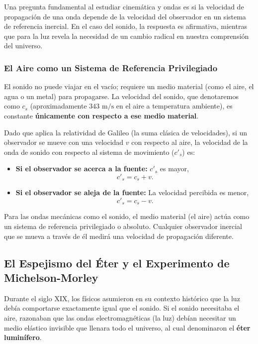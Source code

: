 \documentclass[11pt,a4paper]{book}
\begin{document}
Una pregunta fundamental al estudiar cinemática y ondas es si la velocidad de propagación de una onda depende de la velocidad del observador en un sistema de referencia inercial. En el caso del sonido, la respuesta es afirmativa, mientras que para la luz revela la necesidad de un cambio radical en nuestra comprensión del universo.

\subsubsection{El Aire como un Sistema de Referencia Privilegiado}

El sonido no puede viajar en el vacío; requiere un medio material (como el aire, el agua o un metal) para propagarse. La velocidad del sonido, que denotaremos como $c_s$ (aproximadamente $343 \text{ m/s}$ en el aire a temperatura ambiente), es constante \textbf{únicamente con respecto a ese medio material}.

Dado que aplica la relatividad de Galileo (la suma clásica de velocidades), si un observador se mueve con una velocidad $v$ con respecto al aire, la velocidad de la onda de sonido con respecto al sistema de movimiento ($c'_s$) es:
\begin{itemize}
    \item \textbf{Si el observador se acerca a la fuente:} $c'_s$ es mayor,
    \begin{equation}
       c'_s = c_s + v.
    \end{equation}
    \item \textbf{Si el observador se aleja de la fuente:} La velocidad percibida es menor,
    \begin{equation}
        c'_s = c_s - v.
    \end{equation}
\end{itemize}

Para las ondas mecánicas como el sonido, el medio material (el aire) actúa como un sistema de referencia privilegiado o absoluto. Cualquier observador inercial que se mueva a través de él medirá una velocidad de propagación diferente.

\subsection{El Espejismo del Éter y el Experimento de Michelson-Morley}

Durante el siglo XIX, los físicos asumieron en su contexto histórico que la luz debía comportarse exactamente igual que el sonido. Si el sonido necesitaba el aire, razonaban que las ondas electromagnéticas (la luz) debían necesitar un medio elástico invisible que llenara todo el universo, al cual denominaron el \textbf{éter luminífero}. 
\end{document}
